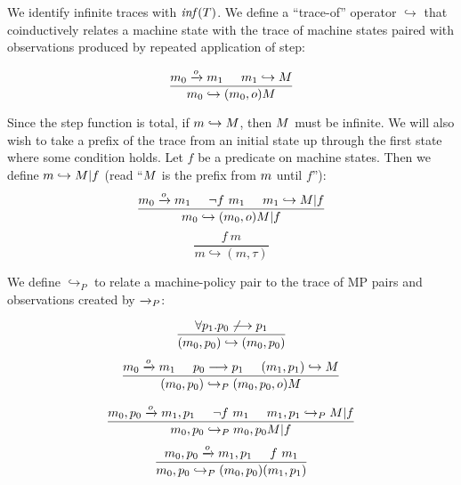 \documentclass[conference]{IEEEtran}
\begin{document}
    We identify infinite traces with \(\mathit{inf}(T)\). We define a ``trace-of'' operator \(\hookrightarrow\)
    that coinductively relates a machine state with the trace of machine states paired with observations
    produced by repeated application of step:

    \[\frac{m_0 \xrightarrow{o} m_1 \hspace{.5cm} m_1 \hookrightarrow M}
           {m_0 \hookrightarrow (m_0,o) M}\]

    Since the step function is total, if \(m \hookrightarrow M\), then \(M\) must be infinite.
    We will also wish to take a prefix of the trace from an initial state up through 
    the first state where some condition holds. Let \(f\) be a predicate on machine states.
    Then we define \(m \hookrightarrow M | f\) (read ``\(M\) is the prefix from
    \(m\) until \(f\)''):
    \[\frac{m_0 \xrightarrow{o} m_1 \hspace{.5cm} \neg f\ m_1 \hspace{.5cm} m_1
              \hookrightarrow M | f}
           {m_0 \hookrightarrow (m_0,o) M | f}\]
    \[\frac{f\ m}
           {m \hookrightarrow (m,\tau)}\]

    We define \(\hookrightarrow_P\) to relate a machine-policy pair to the trace of MP pairs and observations
    created by \(\xrightarrow{}_P\):

    \[\frac{\forall p_1 . p_0 \not \longrightarrow p_1}
           {(m_0,p_0) \hookrightarrow (m_0,p_0)}\]
    \[\frac{m_0 \xrightarrow{o} m_1 \hspace{.5cm} p_0 \longrightarrow p_1 \hspace{.5cm}
              (m_1,p_1) \hookrightarrow M}
           {(m_0,p_0) \hookrightarrow_P (m_0,p_0,o) M}\]
    
    \[\frac{m_0,p_0 \xrightarrow{o} m_1,p_1 \hspace{.5cm} \neg f\ m_1 \hspace{.5cm}
              m_1,p_1 \hookrightarrow_P M | f }
           {m_0,p_0 \hookrightarrow_P m_0,p_0 M | f}\]
    \[\frac{m_0,p_0 \xrightarrow{o} m_1,p_1 \hspace{.5cm} f\ m_1}
           {m_0,p_0 \hookrightarrow_P (m_0,p_0) (m_1,p_1)}\]

\end{document}
